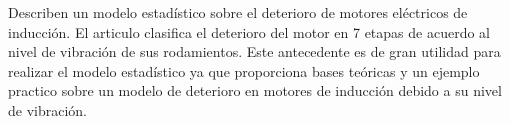 \textcite{Ramazan} Describen un modelo estadístico sobre el deterioro de
motores eléctricos de inducción. El articulo clasifica el deterioro del motor
en 7 etapas de acuerdo al nivel de vibración de sus rodamientos. Este
antecedente es de gran utilidad para realizar el modelo estadístico ya que
proporciona bases teóricas y un ejemplo practico sobre un modelo de deterioro
en motores de inducción debido a su nivel de vibración.

